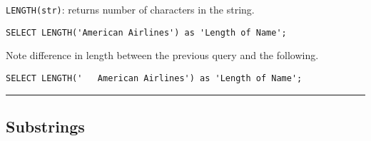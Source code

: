 \documentclass{article}
\begin{document}
\begin{outline}
   \1 \texttt{LENGTH(str)}: returns number of characters in the string.
   
   
\begin{lstlisting}[frame=single]  
SELECT LENGTH('American Airlines') as 'Length of Name';
\end{lstlisting} 

Note difference in length between the previous query and the following.   
   
\begin{lstlisting}[frame=single]  
SELECT LENGTH('   American Airlines') as 'Length of Name';
\end{lstlisting}

\end{outline}
 
  
  

\hspace{-0.5cm}\rule[-0.101in]{\textwidth}{0.0025in}
    
  
  
  
  
  
  
  






  

\subsection*{Substrings}
\end{document}
